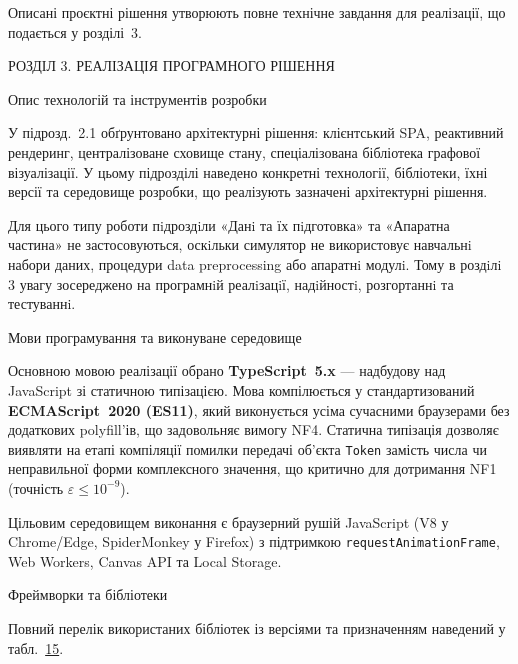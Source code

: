 Описані проєктні рішення утворюють повне технічне завдання для
реалізації, що подається у розділі~3.

\protect{}\label{_Toc229681122}{}РОЗДІЛ 3. РЕАЛІЗАЦІЯ
ПРОГРАМНОГО РІШЕННЯ

\protect{}\label{_Toc229681123}{}Опис технологій та
інструментів розробки

У підрозд.~2.1 обґрунтовано архітектурні рішення: клієнтський SPA,
реактивний рендеринг, централізоване сховище стану, спеціалізована
бібліотека графової візуалізації. У цьому підрозділі наведено конкретні
технології, бібліотеки, їхні версії та середовище розробки, що
реалізують зазначені архітектурні рішення.

Для цього типу роботи пiдроздiли «Данi та їх пiдготовка» та «Апаратна\\
частина» не застосовуються, оскiльки симулятор не використовує навчальнi
набори даних, процедури data preprocessing або апаратнi модулi. Тому в
роздiлi 3 увагу зосереджено на програмнiй реалiзацiї, надiйностi,
розгортаннi та тестуваннi.

Мови програмування та виконуване середовище

Основною мовою реалізації обрано \textbf{TypeScript~5.x} --- надбудову
над JavaScript зі статичною типізацією. Мова компілюється у
стандартизований \textbf{ECMAScript~2020 (ES11)}, який виконується усіма
сучасними браузерами без додаткових polyfill'ів, що задовольняє вимогу
NF4. Статична типізація дозволяє виявляти на етапі компіляції помилки
передачі об'єкта \texttt{Token} замість числа чи неправильної форми
комплексного значення, що критично для дотримання NF1 (точність
\(\varepsilon \leq 10^{- 9}\)).

Цільовим середовищем виконання є браузерний рушій JavaScript (V8 у
Chrome/Edge, SpiderMonkey у Firefox) з підтримкою
\texttt{requestAnimationFrame}, Web Workers, Canvas API та Local
Storage.

Фреймворки та бібліотеки

Повний перелік використаних бібліотек із версіями та призначенням
наведений у табл.~\hyperref[tab:tech_stack]{15}.

